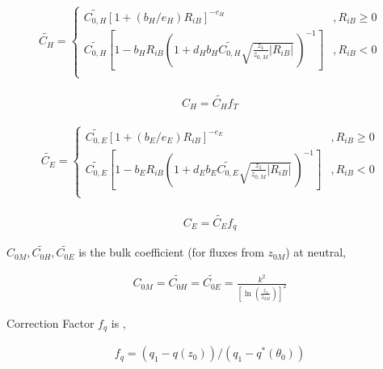 \begin{eqnarray}
    \widetilde{C_H} = \left\{
      \begin{array}{lr}
      \widetilde{C_{0,H}} [ 1 + (b_H/e_H) R_{iB} ]^{-e_H}
            &,
          R_{iB} \geq 0 \\
      \widetilde{C_{0,H}} \left[ 1 - b_H R_{iB}
                                  \left( 1+ d_H b_H \widetilde{C_{0,H}}
                                  \sqrt{\frac{z_1}{z_{0,M}}| R_{iB}|} \,
                                  \right)^{-1} \right]
             &,     
          R_{iB} < 0 \\
      \end{array} \right.
\end{eqnarray}

\begin{eqnarray}
    C_H = \widetilde{C_H} f_T
\end{eqnarray}

\begin{eqnarray}
    \widetilde{C_E} = \left\{
      \begin{array}{lr}
      \widetilde{C_{0,E}} [ 1 + (b_E/e_E) R_{iB} ]^{-e_E}
            &,
          R_{iB} \geq 0 \\
      \widetilde{C_{0,E}} \left[ 1 - b_E R_{iB}
                                  \left( 1+ d_E b_E \widetilde{C_{0,E}}
                                  \sqrt{\frac{z_1}{z_{0,M}}| R_{iB}|} \,
                                  \right)^{-1} \right]      
          &,
          R_{iB} < 0 \\
      \end{array} \right.
\end{eqnarray}

\begin{eqnarray}
    C_E = \widetilde{C_E} f_q
\end{eqnarray}

\(C_{0M}, \widetilde{C_{0H}}, \widetilde{C_{0E}}\) is the bulk
coefficient (for fluxes from \(z_{0M}\)) at neutral,

\begin{eqnarray}
    C_{0M}  =  \widetilde{C_{0H}}  =  \widetilde{C_{0E}}  =
       \frac{k^2}{\left[\ln \left(\frac{z_1}{z_{0M}}\right)\right]^2 }
\end{eqnarray}

Correction Factor \(f_q\) is ,

\begin{eqnarray}
  f_q = (q_1 - q(z_0))/(q_1 - q^{\ast}(\theta_0))
\end{eqnarray}

